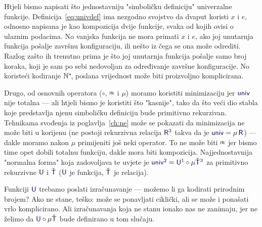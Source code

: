 Htjeli bismo napisati što jednostavniju "simboličku definiciju" univerzalne funkcije. Definicija~\eqref{eq:univdef} ima nezgodno svojstvo da dvaput koristi $x$ i $e$, odnosno napisana je kao kompozicija dvije funkcije, svaka od kojih ovisi o ulaznim podacima. No vanjska funkcija ne mora primati $x$ i $e$, ako joj unutarnja funkcija pošalje završnu konfiguraciju, ili nešto iz čega se ona može odrediti. Razlog zašto ih trenutno prima je što joj unutarnja funkcija pošalje samo broj koraka, koji je sam po sebi nedovoljan za određivanje završne konfiguracije. No koristeći kodiranje ${\mathbb N}^*\!$, poslana vrijednost može biti proizvoljno komplicirana.

Drugo, od osnovnih operatora ($\circ$, $\pr$ i $\mu$) moramo koristiti minimizaciju jer $\f{univ}$ nije totalna --- ali htjeli bismo je koristiti što "kasnije", tako da što veći dio stabla koje predstavlja njenu simboličku definiciju bude primitivno rekurzivan. Tehnikama svođenja iz poglavlja~\ref{ch:ne} može se pokazati da minimizacija ne može biti u korijenu (ne postoji rekurzivna relacija $\f{R}^3$ takva da je $\f{univ}=\mu\,\f{R}$) --- dakle moramo nakon $\mu$ primijeniti još neki operator. To ne može biti $\pr$ jer bismo time opet dobili totalnu funkciju, dakle mora biti kompozicija. Najjednostavnija "normalna forma" koja zadovoljava te uvjete je $\f{univ}^2=\f U^1\circ\mu\f{\check T}^3$ za primitivno rekurzivne $\f U$ i $\f{\check T}$ ($\f U$ je funkcija, $\f{\check T}$ je relacija).


Funkciji $\f U$ trebamo poslati izračunavanje --- možemo li ga kodirati prirodnim brojem? Ako ne stane, teško: može se ponavljati ciklički, ali se može i ponašati vrlo komplicirano. Ali izračunavanja koja ne stanu ionako nas ne zanimaju, jer ne želimo da $\f U\circ\mu\f{\check T}$ bude definirano u tom slučaju.

